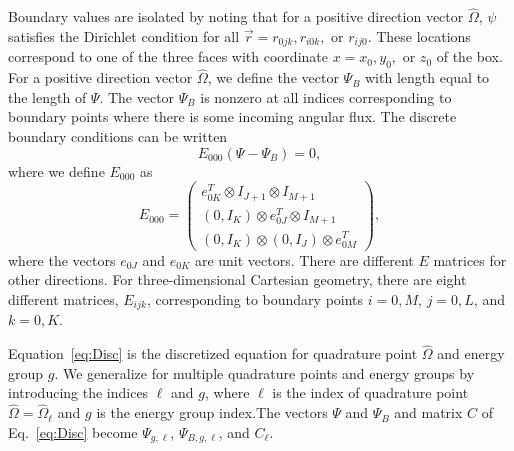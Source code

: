 Boundary values are isolated by noting that for a positive direction vector $\hat{\Omega}$, $\psi$ satisfies the Dirichlet condition for all $\vec{r} = r_{0jk}, r_{i0k},$ or $r_{ij0}$. These locations correspond to one of the three faces with coordinate $x = x_{0}, y_{0},$ or $z_{0}$ of the box. For a positive direction vector $\hat{\Omega}$, we define the vector $\Psi_{B}$ with length equal to the length of $\Psi$. The vector $\Psi_{B}$ is nonzero at all indices corresponding to boundary points where there is some incoming angular flux. The discrete boundary conditions can be written
\begin{equation}
	E_{000}(\Psi - \Psi_{B}) = 0,
\end{equation}
where we define $E_{000}$ as
\begin{equation}
	E_{000} = \begin{pmatrix}
				e_{0K}^{T} \otimes I_{J+1} \otimes I_{M+1} \\
				(0,I_{K}) \otimes e_{0J}^{T} \otimes I_{M+1} \\
				(0,I_{K}) \otimes (0,I_{J}) \otimes e_{0M}^{T}
			\end{pmatrix},
\end{equation}
where the vectors $e_{0J}$ and $e_{0K}$ are unit vectors. There are different $E$ matrices for other directions. For three-dimensional Cartesian geometry, there are eight different matrices, $E_{ijk}$, corresponding to boundary points $i=0,M$, $j=0,L$, and $k = 0,K$.

Equation~\ref{eq:Disc} is the discretized equation for quadrature point $\hat{\Omega}$ and energy group $g$. We generalize for multiple quadrature points and energy groups by introducing the indices $\ell$ and $g$, where $\ell$ is the index of quadrature point $\hat{\Omega} = \hat{\Omega}_{\ell}$ and $g$ is the energy group index.The vectors $\Psi$ and $\Psi_{B}$ and matrix $C$ of Eq.~\ref{eq:Disc} become $\Psi_{g,\ell}$, $\Psi_{B,g,\ell}$, and $C_{\ell}$.

